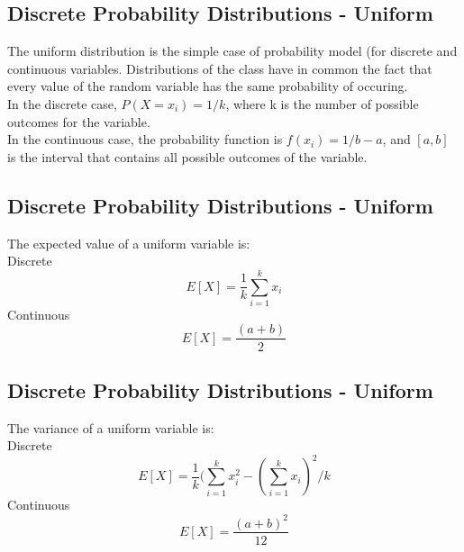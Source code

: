 \documentclass[11pt]{article}
\begin{document}
	\subsection*{Discrete Probability Distributions - Uniform}
	The uniform distribution is the simple case of probability model (for discrete and continuous variables. Distributions of the class have in common the fact that every value of the random variable has the same probability of occuring.
	\newline\\
	In the discrete case, $P(X=x_i) = 1/k$, where k is the number of possible outcomes for the variable.
	\newline\\
	In the continuous case, the probability function is $f(x_i) = 1/b-a$, and $[a,b]$ is the interval that contains all possible outcomes of the variable.

	\subsection*{Discrete Probability Distributions - Uniform}
	The expected value of a uniform variable is:
	\newline\\
	Discrete
	\[E[X] = \frac{1}{k} \sum\limits_{i=1}^k x_i\]
	Continuous
	\[E[X] = \frac{(a+b)}{2} \]

	\subsection*{Discrete Probability Distributions - Uniform}
	The variance of a uniform variable is:
	\newline\\
	Discrete
	\[E[X] = \frac{1}{k} (\sum\limits_{i=1}^k x_i^2-(\sum\limits_{i=1}^k x_i)^2/k\]
	Continuous
	\[E[X] = \frac{(a+b)^2}{12} \]
\end{document}

